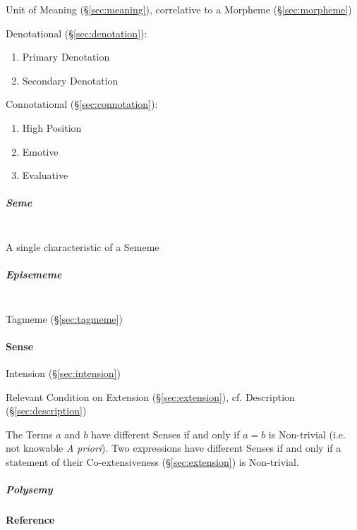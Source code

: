 Unit of Meaning (\S\ref{sec:meaning}), correlative to a Morpheme
(\S\ref{sec:morpheme})

Denotational (\S\ref{sec:denotation}):

\begin{enumerate}
  \item Primary Denotation
  \item Secondary Denotation
\end{enumerate}

Connotational (\S\ref{sec:connotation}):

\begin{enumerate}
  \item High Position
  \item Emotive
  \item Evaluative
\end{enumerate}



\subparagraph{Seme}\label{sec:seme}
\hfill \\

A single characteristic of a Sememe



\subparagraph{Episememe}\label{sec:episememe}
\hfill \\

Tagmeme (\S\ref{sec:tagmeme})



\paragraph{Sense}\label{sec:sense}
\cite{chalmers02}

Intension (\S\ref{sec:intension})

Relevant Condition on Extension (\S\ref{sec:extension}), cf.
Description (\S\ref{sec:description})

The Terms $a$ and $b$ have different Senses if and only if $a = b$ is
Non-trivial (i.e. not knowable \emph{A priori}). Two expressions have
different Senses if and only if a statement of their Co-extensiveness
(\S\ref{sec:extension}) is Non-trivial.

\subparagraph{Polysemy}\label{sec:polysemy}



\paragraph{Reference}\label{sec:reference}
\hfill \\

